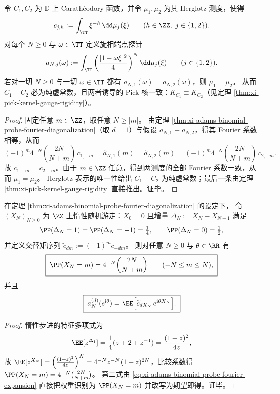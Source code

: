 \begin{theorem}\label{thm:xi-adams-binomial-probe-completeness-strictification}
令 \(C_1,C_2\) 为 \(\mathbb D\) 上 Carath\'eodory 函数，并令 \(\mu_1,\mu_2\) 为其 Herglotz 测度，使得
\[
c_{j,h}:=\int_{\TT}\xi^{-h}\,\dd\mu_j(\xi)\qquad(h\in\ZZ,\ j\in\{1,2\}).
\]
对每个 \(N\ge 0\) 与 \(\omega\in\TT\) 定义旋相端点探针
\[
a_{N,j}(\omega):=\int_{\TT}\left(\frac{|1-\omega\xi|^2}{4}\right)^{N}\dd\mu_j(\xi)\qquad(j\in\{1,2\}).
\]
若对一切 \(N\ge 0\) 与一切 \(\omega\in\TT\) 都有 \(a_{N,1}(\omega)=a_{N,2}(\omega)\)，则 \(\mu_1=\mu_2\)。
从而 \(C_1-C_2\) 必为纯虚常数，且两者诱导的 Pick 核一致：\(K_{C_1}\equiv K_{C_2}\)（见定理 \ref{thm:xi-pick-kernel-gauge-rigidity}）。
\end{theorem}
\begin{proof}
固定任意 \(m\in\ZZ\)，取任意 \(N\ge |m|\)。
由定理 \ref{thm:xi-adams-binomial-probe-fourier-diagonalization}（取 \(d=1\)）与假设 \(a_{N,1}\equiv a_{N,2}\)，得其 Fourier 系数相等，从而
\[
(-1)^m4^{-N}\binom{2N}{N+m}\,c_{1,-m}
=\widehat a_{N,1}(m)
=\widehat a_{N,2}(m)
=(-1)^m4^{-N}\binom{2N}{N+m}\,c_{2,-m}.
\]
故 \(c_{1,-m}=c_{2,-m}\)。由于 \(m\in\ZZ\) 任意，得到两测度的全部 Fourier 系数一致，从而 \(\mu_1=\mu_2\)。
Herglotz 表示的唯一性给出 \(C_1-C_2\) 为纯虚常数；最后一条由定理 \ref{thm:xi-pick-kernel-gauge-rigidity} 直接推出。证毕。
\end{proof}

\begin{corollary}[惰性随机游走热核表象]\label{cor:xi-adams-binomial-probe-lazy-walk-heat-kernel}
在定理 \ref{thm:xi-adams-binomial-probe-fourier-diagonalization} 的设定下，
令 \((X_N)_{N\ge 0}\) 为 \(\ZZ\) 上惰性随机游走：\(X_0=0\) 且增量 \(\Delta_N:=X_N-X_{N-1}\) 满足
\[
\PP(\Delta_N=1)=\PP(\Delta_N=-1)=\tfrac14,\qquad \PP(\Delta_N=0)=\tfrac12,
\]
并定义交替矩序列 \(\widetilde c_{dm}:=(-1)^m c_{-dm}\)。
则对任意 \(N\ge 0\) 与 \(\theta\in\RR\) 有
\[
\boxed{\;
\PP(X_N=m)=4^{-N}\binom{2N}{N+m}\qquad(-N\le m\le N),\;}
\]
并且
\[
\boxed{\;
a_N^{(d)}(e^{\mathrm{i}\theta})
=\EE\Bigl[\widetilde c_{dX_N}\,e^{\mathrm{i}\theta X_N}\Bigr].\;}
\]
\end{corollary}
\begin{proof}
惰性步进的特征多项式为
\[
\EE[z^{\Delta_1}]=\frac14(z+2+z^{-1})=\frac{(1+z)^2}{4z},
\]
故
\(
\EE[z^{X_N}]=\left(\frac{(1+z)^2}{4z}\right)^N
=4^{-N}z^{-N}(1+z)^{2N}
\)，比较系数得 \(\PP(X_N=m)=4^{-N}\binom{2N}{N+m}\)。
第二式由 \eqref{eq:xi-adams-binomial-probe-fourier-expansion} 直接把权重识别为 \(\PP(X_N=m)\) 并改写为期望即得。证毕。
\end{proof}

